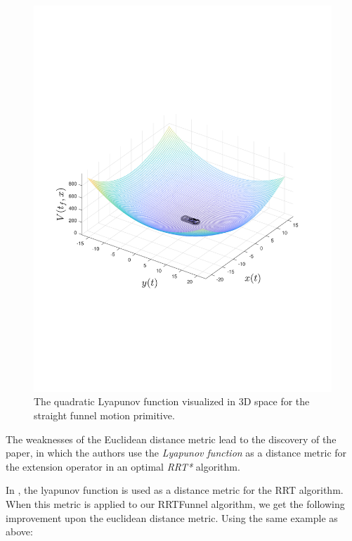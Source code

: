 \begin{figure}
  \includegraphics[scale=.5]{figures/rrtfunnel/straight-funnel-lyapunov-3d.pdf}
  \caption{The quadratic Lyapunov function visualized in 3D space for the
    straight funnel motion primitive.}
\end{figure}


The weaknesses of the Euclidean distance metric lead to the discovery of the
\cite{parkFeedbackMotionPlanning2015} paper, in which the authors use the
\textit{Lyapunov function} as a distance metric for the extension operator in an
optimal \textit{RRT*} algorithm.

In \cite{parkFeedbackMotionPlanning2015}, the lyapunov function is used as a
distance metric for the RRT algorithm. When this metric is applied to our
RRTFunnel algorithm, we get the following improvement upon the euclidean
distance metric. Using the same example as above:


